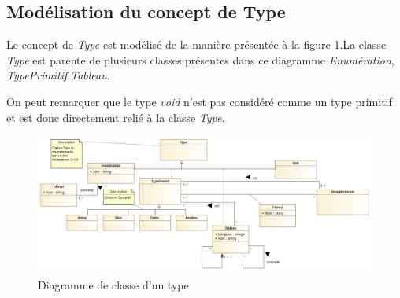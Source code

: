 
\subsection{Modélisation du concept de Type}
\label{sec:question8}

Le concept de \emph{Type} est modélisé de la manière présentée à la figure \ref{fig:type}.La classe \emph{Type} est parente de plusieurs classes présentes dans ce diagramme \emph{Enumération}, \emph{TypePrimitif},\emph{Tableau}. 

On peut remarquer que le type \emph{void} n'est pas considéré comme un type primitif et est donc directement relié à la classe \emph{Type}. 

\begin{figure}
	\centering
	\includegraphics[width=500pt]{assets/class__Type}
	\caption{Diagramme de classe d'un type}
	\label{fig:type}
\end{figure}
